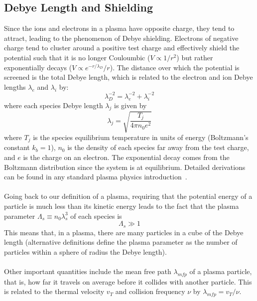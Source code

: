 \subsection{Debye Length and Shielding} \label{ssec:debye}
Since the ions and electrons in a plasma have opposite charge, they tend to attract, leading to the phenomenon of Debye shielding. Electrons of negative charge tend to cluster around a positive test charge and effectively shield the potential such that it is no longer Couloumbic ($V\propto1/r^2$) but rather exponentially decays ($V\propto e^{-r/\lambda_D}/r$). The distance over which the potential is screened is the total Debye length, which is related to the electron and ion Debye lengths $\lambda_e$ and $\lambda_i$ by:
\begin{equation}
  \lambda_D^{-2}=\lambda_e^{-2}+\lambda_i^{-2}
\end{equation}
where each species Debye length $\lambda_j$ is given by
\begin{equation}
  \lambda_j=\sqrt{\frac{T_j}{4\pi n_0 e^2}}
\end{equation}
where $T_j$ is the species equilibrium temperature in units of energy (Boltzmann's constant $k_b=1$), $n_0$ is the density of each species far away from the test charge, and $e$ is the charge on an electron. The exponential decay comes from the Boltzmann distribution since the system is at equilibrium. Detailed derivations can be found in any standard plasma physics introduction~\cite{Nicholson, GurnettBhatt}. \\
\\
Going back to our definition of a plasma, requiring that the potential energy of a particle is much less than its kinetic energy leads to the fact that the plasma parameter $\Lambda_s\equiv n_0\lambda_s^3$ of each species is
\begin{equation}
  \Lambda_s\gg1
\end{equation}
This means that, in a plasma, there are many particles in a cube of the Debye length (alternative definitions define the plasma parameter as the number of particles within a sphere of radius the Debye length). \\
\\
Other important quantities include the mean free path $\lambda_{mfp}$ of a plasma particle, that is, how far it travels on average before it collides with another particle. This is related to the thermal velocity $v_T$ and collision frequency $\nu$ by $\lambda_{mfp}=v_T/\nu$. \\
\\
